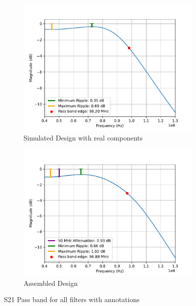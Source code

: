 \documentclass[letterpaper,12pt]{article}
\begin{document}
\begin{figure}[H]
    \medskip
  
    \begin{subfigure}[t]{.49\textwidth}
      \centering
      \includegraphics[width=\linewidth]{figures/4.real}
      \caption{Simulated Design with real components}
    \end{subfigure}
    \hfill
    \begin{subfigure}[t]{.49\textwidth}
      \centering
      \includegraphics[width=\linewidth]{figures/4.assembled}
      \caption{Assembled Design}
    \end{subfigure}

    \vspace{0.5cm}
    \caption{S21 Pass band for all filters with annotations}
  \end{figure}
\end{document}
